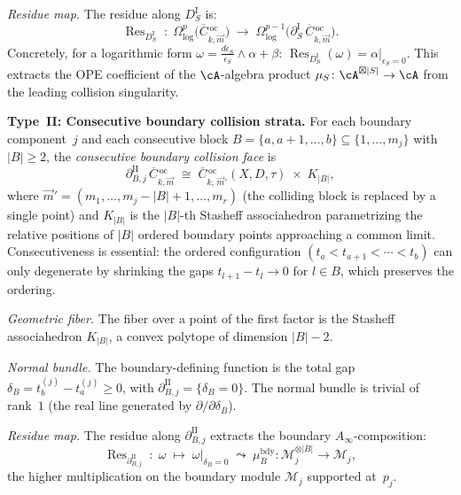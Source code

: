 \begin{proposition}
\emph{Residue map.}
The residue along $D_S^{\mathrm{I}}$ is:
\begin{equation}\label{eq:typeI-residue}
\operatorname{Res}_{D_S^{\mathrm{I}}}
\;\colon\;
\Omega^p_{\log}\bigl(
\overline{C}{}^{\,\mathrm{oc}}_{k,\vec{m}}\bigr)
\;\longrightarrow\;
\Omega^{p-1}_{\log}\bigl(
\partial_S^{\mathrm{I}}\,
\overline{C}{}^{\,\mathrm{oc}}_{k,\vec{m}}\bigr).
\end{equation}
Concretely, for a logarithmic form
$\omega = \frac{d\epsilon_S}{\epsilon_S} \wedge \alpha + \beta$:
$\operatorname{Res}_{D_S^{\mathrm{I}}}(\omega) = \alpha|_{\epsilon_S=0}$.
This extracts the OPE coefficient of the $\cA$-algebra product
$\mu_S \colon \cA^{\boxtimes |S|} \to \cA$ from the leading
collision singularity.

\medskip
\noindent\textbf{Type~II: Consecutive boundary collision strata.}
For each boundary component~$j$ and each consecutive block
$B = \{a, a{+}1, \ldots, b\} \subseteq \{1, \ldots, m_j\}$
with $|B| \geq 2$, the
\emph{consecutive boundary collision face} is
\begin{equation}\label{eq:typeII-stratum}
\partial_{B,j}^{\mathrm{II}}\,
\overline{C}{}^{\,\mathrm{oc}}_{k,\vec{m}}
\;\cong\;
\overline{C}{}^{\,\mathrm{oc}}_{k,\, \vec{m}'}(X, D, \tau)
\;\times\;
K_{|B|},
\end{equation}
where $\vec{m}' = (m_1, \ldots, m_j - |B| + 1, \ldots, m_r)$
(the colliding block is replaced by a single point) and $K_{|B|}$
is the $|B|$-th Stasheff associahedron parametrizing the relative
positions of $|B|$ ordered boundary points approaching a common
limit.  Consecutiveness is essential: the ordered configuration
$(t_a < t_{a+1} < \cdots < t_b)$ can only degenerate by
shrinking the gaps $t_{l+1} - t_l \to 0$ for $l \in B$, which
preserves the ordering.

\emph{Geometric fiber.}
The fiber over a point of the first factor is the Stasheff
associahedron $K_{|B|}$, a convex polytope of dimension
$|B| - 2$.

\emph{Normal bundle.}
The boundary-defining function is the total gap
$\delta_B = t_b^{(j)} - t_a^{(j)} \geq 0$, with
$\partial_{B,j}^{\mathrm{II}} = \{\delta_B = 0\}$.
The normal bundle is trivial of rank~$1$ (the real line
generated by $\partial/\partial\delta_B$).

\emph{Residue map.}
The residue along $\partial_{B,j}^{\mathrm{II}}$ extracts the
boundary $A_\infty$-composition:
\begin{equation}\label{eq:typeII-residue}
\operatorname{Res}_{\partial_{B,j}^{\mathrm{II}}}
\;\colon\;
\omega \;\longmapsto\;
\omega|_{\delta_B = 0}
\;\leadsto\;
\mu_B^{\mathrm{bdy}}
\colon \mathcal{M}_j^{\otimes |B|} \to \mathcal{M}_j,
\end{equation}
the higher multiplication on the boundary module
$\mathcal{M}_j$ supported at~$p_j$.


\end{proposition}
